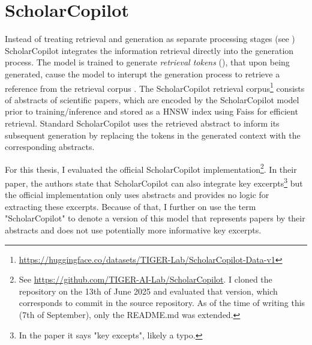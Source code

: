 
\section{ScholarCopilot}\label{scholarcopilot}
Instead of treating retrieval and generation as separate processing stages (see ) ScholarCopilot \cite{wang2025scholarcopilot} integrates the information retrieval directly into the generation process. The model is trained to generate \emph{retrieval tokens} (\mono{[RET]}), that upon being generated, cause the model to interupt the generation process to retrieve a reference from the retrieval corpus \cite{wang2025scholarcopilot}. The ScholarCopilot retrieval corpus\footnote{\url{https://huggingface.co/datasets/TIGER-Lab/ScholarCopilot-Data-v1}} consists of abstracts of scientific papers, which are encoded by the ScholarCopilot model prior to training/inference and stored as a HNSW \cite{malkov2018efficient} index using Faiss \cite{douze2024faiss} for efficient retrieval. Standard ScholarCopilot uses the retrieved abstract to inform its subsequent generation by replacing the \mono{[RET]} tokens in the generated context with the corresponding abstracts. 

For this thesis, I evaluated the official ScholarCopilot implementation\footnote{See \url{https://github.com/TIGER-AI-Lab/ScholarCopilot}. I cloned the repository on the 13th of June 2025 and evaluated that version, which corresponds to commit  in the source repository. As of the time of writing this (7th of September), only the README.md was extended.}. In their paper, the authors state that ScholarCopilot can also integrate key excerpts\footnote{In the paper it says "key excepts", likely a typo.} \cite{wang2025scholarcopilot} but the official implementation only uses abstracts and provides no logic for extracting these excerpts. Because of that, I further on use the term "ScholarCopilot" to denote a version of this model that represents papers by their abstracts and does not use potentially more informative key excerpts.

